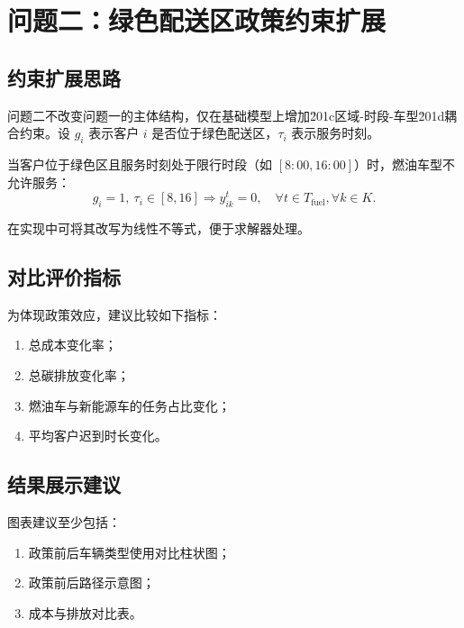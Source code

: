 \section{问题二：绿色配送区政策约束扩展}

\subsection{约束扩展思路}
问题二不改变问题一的主体结构，仅在基础模型上增加\u201c区域-时段-车型\u201d耦合约束。设 $g_i$ 表示客户 $i$ 是否位于绿色配送区，$\tau_i$ 表示服务时刻。

当客户位于绿色区且服务时刻处于限行时段（如 $[8{:}00,16{:}00]$）时，燃油车型不允许服务：
\begin{equation}
g_i=1,\ \tau_i\in[8,16] \Rightarrow y_{ik}^t=0,\quad \forall t\in T_{\text{fuel}},\forall k\in K.
\end{equation}

在实现中可将其改写为线性不等式，便于求解器处理。

\subsection{对比评价指标}
为体现政策效应，建议比较如下指标：
\begin{enumerate}[label=\arabic*)]
    \item 总成本变化率；
    \item 总碳排放变化率；
    \item 燃油车与新能源车的任务占比变化；
    \item 平均客户迟到时长变化。
\end{enumerate}

\subsection{结果展示建议}
图表建议至少包括：
\begin{enumerate}[label=\arabic*)]
    \item 政策前后车辆类型使用对比柱状图；
    \item 政策前后路径示意图；
    \item 成本与排放对比表。
\end{enumerate}
